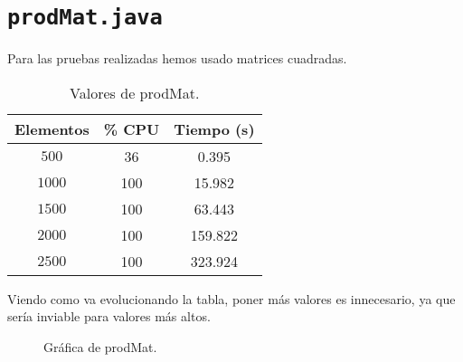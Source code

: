 \documentclass[12pt,letterpaper]{article}
\begin{document}
\section{\texttt{prodMat.java}}
\noindent
Para las pruebas realizadas hemos usado matrices cuadradas.
\begin{center}
	\begin{table}[htbp]
		\begin{center}
			\begin{tabular}{|c|c|c|}
				\hline
				\textbf{Elementos} & \textbf{\% CPU} & \textbf{Tiempo (s)}  \\
				\hline 
				$500$ & 36 & 0.395\\ \hline	
				$1000$ & 100 & 15.982\\ \hline
				$1500$ & 100 & 63.443\\ \hline
				$2000$ & 100 & 159.822\\ \hline
				$2500$ & 100 & 323.924\\ \hline
			\end{tabular}
			\caption{Valores de prodMat.}
			\label{tabla:Valores de prodMat}
		\end{center}
	\end{table}
\end{center}
\noindent
Viendo como va evolucionando la tabla, poner más valores es innecesario, ya que sería inviable para valores más altos.
\begin{figure}
	\begin{center}
		\caption{Gráfica de prodMat.}
		\label{fig: prodMat}
	\end{center}	
\end{figure}


\newpage
\end{document}
